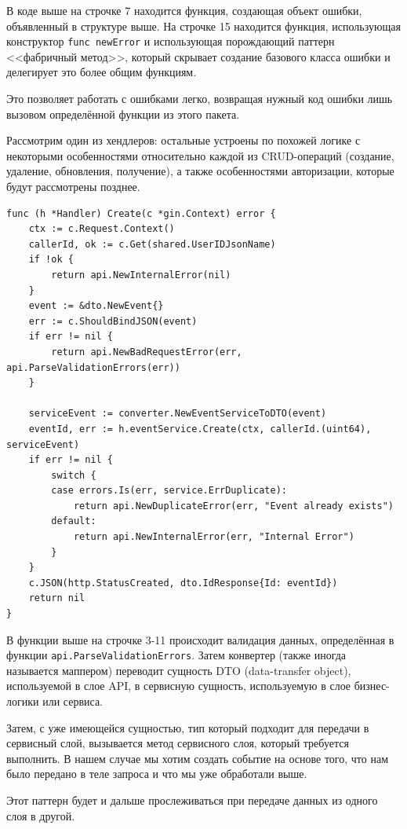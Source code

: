 \documentclass[diploma]{SCWorks}
\begin{document}
В коде выше на строчке 7 находится функция, создающая объект ошибки, объявленный
в структуре выше. На строчке 15 находится функция, использующая конструктор 
\texttt{func newError} и использующая порождающий паттерн <<фабричный метод>>,
который скрывает создание базового класса ошибки и делегирует это более общим
функциям.

Это позволяет работать с ошибками легко, возвращая нужный код ошибки лишь 
вызовом определённой функции из этого пакета.

Рассмотрим один из хендлеров: остальные устроены по похожей логике с некоторыми
особенностями относительно каждой из CRUD-операций (создание, удаление, 
обновления, получение), а также особенностями авторизации, которые будут 
рассмотрены позднее.

\begin{verbatim}
func (h *Handler) Create(c *gin.Context) error {
    ctx := c.Request.Context()
    callerId, ok := c.Get(shared.UserIDJsonName)
    if !ok {
        return api.NewInternalError(nil)
    }
    event := &dto.NewEvent{}
    err := c.ShouldBindJSON(event)
    if err != nil {
        return api.NewBadRequestError(err, api.ParseValidationErrors(err))
    }

    serviceEvent := converter.NewEventServiceToDTO(event)
    eventId, err := h.eventService.Create(ctx, callerId.(uint64), serviceEvent)
    if err != nil {
        switch {
        case errors.Is(err, service.ErrDuplicate):
            return api.NewDuplicateError(err, "Event already exists")
        default:
            return api.NewInternalError(err, "Internal Error")
        }
    }
    c.JSON(http.StatusCreated, dto.IdResponse{Id: eventId})
    return nil
}
\end{verbatim}

В функции выше на строчке 3-11 происходит валидация данных, определённая в 
функции \texttt{api.ParseValidationErrors}. Затем конвертер (также иногда
называется маппером) переводит сущность DTO (data-transfer object), используемой
в слое API, в сервисную сущность, используемую в слое бизнес-логики или сервиса.

Затем, с уже имеющейся сущностью, тип который подходит для передачи в сервисный
слой, вызывается метод сервисного слоя, который требуется выполнить. В нашем
случае мы хотим создать событие на основе того, что нам было передано в 
теле запроса и что мы уже обработали выше.

Этот паттерн будет и дальше прослеживаться при передаче данных из одного слоя 
в другой.
\end{document}
